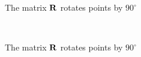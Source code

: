 \begin{frame}
    
    \vspace{2em}
    \begin{figure}
       \begin{center}
        \caption{The matrix $\mathbf R$ rotates points by $90^{\circ}$}
       \end{center}
    \end{figure}

\end{frame}


\begin{frame}
    \
    \vspace{2em}
    \begin{figure}
       \begin{center}
        \caption{The matrix $\mathbf R$ rotates points by $90^{\circ}$}
       \end{center}
    \end{figure}

\end{frame}

